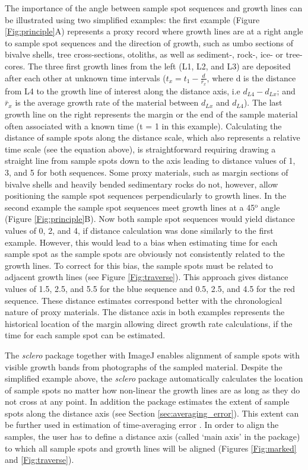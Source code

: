 \documentclass[11pt, a4paper]{article}
\newcommand{\sclero}{\textit{sclero}\xspace}
\begin{document}
The importance of the angle between sample spot sequences and growth lines can be illustrated using two simplified examples: the first example (Figure \ref{Fig:principle}A) represents a proxy record where growth lines are at a right angle to sample spot sequences and the direction of growth, such as umbo sections of bivalve shells, tree cross-sections, otoliths, as well as sediment-, rock-, ice- or tree-cores. The three first growth lines from the left (L1, L2, and L3) are deposited after each other at unknown time intervals ($t_{x} = t_{1} - \frac{d}{\bar{r}_{x}}$, where d is the distance from L4 to the growth line of interest along the distance axis, i.e $d_{L4} - d_{Lx}$; and $\bar{r}_{x}$ is the average growth rate of the material between $d_{Lx}$ and $d_{L4}$). The last growth line on the right represents the margin or the end of the sample material often associated with a known time (t = 1 in this example). Calculating the distance of sample spots along the distance scale, which also represents a relative time scale (see the equation above), is straightforward requiring drawing a straight line from sample spots down to the axis leading to distance values of 1, 3, and 5 for both sequences. Some proxy materials, such as margin sections of bivalve shells and heavily bended sedimentary rocks do not, however, allow positioning the sample spot sequences perpendicularly to growth lines. In the second example the sample spot sequences meet growth lines at a 45$^\mathrm{o}$ angle (Figure \ref{Fig:principle}B). Now both sample spot sequences would yield distance values of 0, 2, and 4, if distance calculation was done similarly to the first example. However, this would lead to a bias when estimating time for each sample spot as the sample spots are obviously not consistently related to the growth lines. To correct for this bias, the sample spots must be related to adjacent growth lines (see Figure \ref{Fig:traverse}). This approach gives distance values of 1.5, 2.5, and 5.5 for the blue sequence and 0.5, 2.5, and 4.5 for the red sequence. These distance estimates correspond better with the chronological nature of proxy materials. The distance axis in both examples represents the historical location of the margin allowing direct growth rate calculations, if the time for each sample spot can be estimated.

The \sclero package together with ImageJ enables alignment of sample spots with visible growth bands from photographs of the sampled material. Despite the simplified example above, the \sclero package automatically calculates the location of sample spots no matter how non-linear the growth lines are as long as they do not cross at any point. In addition the package estimates the extent of sample spots along the distance axis (see Section \ref{sec:averaging_error}). This extent can be further used in estimation of time-averaging error \citep{Goodwin2004, Beelaerts2008}. In order to align the samples, the user has to define a distance axis (called `main axis' in the package) to which all sample spots and growth lines will be aligned (Figures \ref{Fig:marked} and \ref{Fig:traverse}). 
\end{document}
